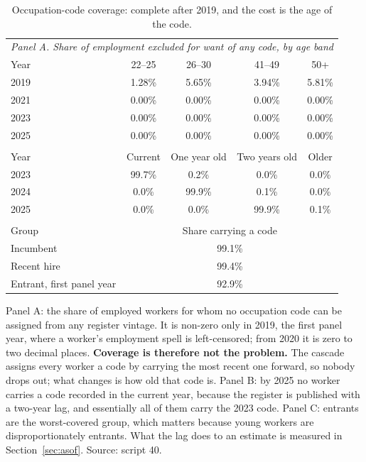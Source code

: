 \begin{table}[ht!]
\centering
\footnotesize
\caption{Occupation-code coverage: complete after 2019, and the cost is the age of the code.}
\label{tab:iv_coverage}
\begin{tabular}{lcccc}
\toprule
\multicolumn{5}{l}{\textit{Panel A. Share of employment excluded for want of any code, by age band}} \\
\addlinespace[2pt]
Year & 22--25 & 26--30 & 41--49 & 50+ \\
\midrule
2019 & 1.28\% & 5.65\% & 3.94\% & 5.81\% \\
2021 & 0.00\% & 0.00\% & 0.00\% & 0.00\% \\
2023 & 0.00\% & 0.00\% & 0.00\% & 0.00\% \\
2025 & 0.00\% & 0.00\% & 0.00\% & 0.00\% \\
\addlinespace[6pt]
\multicolumn{5}{l}{\textit{Panel B. Age of the occupation code, share of all employment}} \\
\addlinespace[2pt]
Year & Current & One year old & Two years old & Older \\
\midrule
2023 & 99.7\% & 0.2\% & 0.0\% & 0.0\% \\
2024 & 0.0\% & 99.9\% & 0.1\% & 0.0\% \\
2025 & 0.0\% & 0.0\% & 99.9\% & 0.1\% \\
\addlinespace[6pt]
\multicolumn{5}{l}{\textit{Panel C. Match rate by worker group, 2020--2023 pooled}} \\
\addlinespace[2pt]
Group & \multicolumn{4}{c}{Share carrying a code} \\
\midrule
Incumbent & \multicolumn{4}{c}{99.1\%} \\
Recent hire & \multicolumn{4}{c}{99.4\%} \\
Entrant, first panel year & \multicolumn{4}{c}{92.9\%} \\
\bottomrule
\end{tabular}
\begin{minipage}{0.92\textwidth}\footnotesize\vspace{4pt}Panel A: the share of employed workers for whom no occupation code can be assigned from any register vintage. It is non-zero only in 2019, the first panel year, where a worker's employment spell is left-censored; from 2020 it is zero to two decimal places. \textbf{Coverage is therefore not the problem.} The cascade assigns every worker a code by carrying the most recent one forward, so nobody drops out; what changes is how old that code is. Panel B: by 2025 no worker carries a code recorded in the current year, because the register is published with a two-year lag, and essentially all of them carry the 2023 code. Panel C: entrants are the worst-covered group, which matters because young workers are disproportionately entrants. What the lag does to an estimate is measured in Section~\ref{sec:asof}. Source: script 40.\end{minipage}
\end{table}
